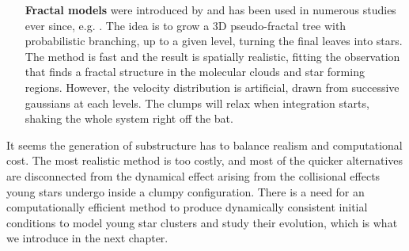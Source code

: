 \begin{itemize}
\item[\textbf{Fractal models}] were introduced by \cite{Goodwin2004} and has been used in numerous studies ever since, e.g. \cite{Allison2009b,Kouwenhoven2010,Parker2016}. The idea is to grow a 3D pseudo-fractal tree with probabilistic branching, up to a given level, turning the final leaves into stars. The method is fast and the result is spatially realistic, fitting the observation that finds a fractal structure in the molecular clouds and star forming regions. However, the velocity distribution is artificial, drawn from successive gaussians at each levels. The clumps will relax when integration starts, shaking the whole system right off the bat.

\end{itemize}

It seems the generation of substructure has to balance realism and computational cost. The most realistic method is too costly, and most of the quicker alternatives are disconnected from the dynamical effect arising from the collisional effects young stars undergo inside a clumpy configuration. There is a need for an computationally efficient method to produce dynamically consistent initial conditions to model young star clusters and study their evolution, which is what we introduce in the next chapter.







